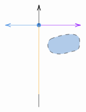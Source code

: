 \documentclass[12pt]{article}
\begin{document}
\[\begin{tikzpicture}[x=0.75pt,y=0.75pt,yscale=-.8,xscale=.8]
    \draw [color={rgb, 255:red, 144; green, 19; blue, 254 }  ,draw opacity=1 ]   (140.15,80.46) -- (221.55,80.46) ;
    \draw [shift={(223.55,80.46)}, rotate = 180] [color={rgb, 255:red, 144; green, 19; blue, 254 }  ,draw opacity=1 ][line width=0.75]    (10.93,-3.29) .. controls (6.95,-1.4) and (3.31,-0.3) .. (0,0) .. controls (3.31,0.3) and (6.95,1.4) .. (10.93,3.29)   ;
    \draw [color={rgb, 255:red, 74; green, 144; blue, 226 }  ,draw opacity=1 ]   (139.98,80.46) -- (74.75,80.46) ;
    \draw [shift={(72.75,80.46)}, rotate = 360] [color={rgb, 255:red, 74; green, 144; blue, 226 }  ,draw opacity=1 ][line width=0.75]    (10.93,-3.29) .. controls (6.95,-1.4) and (3.31,-0.3) .. (0,0) .. controls (3.31,0.3) and (6.95,1.4) .. (10.93,3.29)   ;
    \draw [shift={(139.98,80.46)}, rotate = 180] [color={rgb, 255:red, 74; green, 144; blue, 226 }  ,draw opacity=1 ][fill={rgb, 255:red, 74; green, 144; blue, 226 }  ,fill opacity=1 ][line width=0.75]      (0, 0) circle [x radius= 3.35, y radius= 3.35]   ;
    \draw [color={rgb, 255:red, 245; green, 166; blue, 35 }  ,draw opacity=1 ]   (139.98,150.39) -- (140.15,80.46) ;
    \draw [color={rgb, 255:red, 245; green, 166; blue, 35 }  ,draw opacity=1 ]   (139.98,219.6) -- (139.98,150.39) ;
    \draw    (140.15,80.46) -- (140.15,41.72) ;
    \draw [shift={(140.15,39.72)}, rotate = 90] [color={rgb, 255:red, 0; green, 0; blue, 0 }  ][line width=0.75]    (10.93,-3.29) .. controls (6.95,-1.4) and (3.31,-0.3) .. (0,0) .. controls (3.31,0.3) and (6.95,1.4) .. (10.93,3.29)   ;
    \draw    (139.98,245.34) -- (139.98,219.6) ;
    \draw  [fill={rgb, 255:red, 0; green, 87; blue, 184 }  ,fill opacity=0.3 ][dash pattern={on 4.5pt off 4.5pt}] (164.51,107.89) .. controls (173.51,103.89) and (220.51,87.89) .. (221.51,110.89) .. controls (222.51,133.89) and (215.51,130.89) .. (204.51,133.89) .. controls (193.51,136.89) and (184.51,140.89) .. (169.51,136.89) .. controls (154.51,132.89) and (155.51,111.89) .. (164.51,107.89) -- cycle ;

\end{tikzpicture}\]
\end{document}
